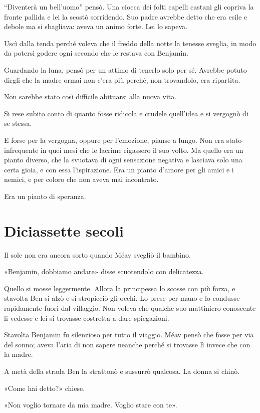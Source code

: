 \documentclass[a4paper,10pt]{memoir}
\begin{document}
``Diventerà un bell'uomo'' pensò. Una ciocca dei folti capelli castani gli copriva la fronte pallida e lei la scostò
sorridendo. Suo padre avrebbe detto che era esile e debole ma si sbagliava: aveva un animo forte. Lei lo sapeva.

Uscì dalla tenda perché voleva che il freddo della notte la tenesse sveglia, in modo da potersi godere ogni secondo che
le restava con Benjamin.

Guardando la luna, pensò per un attimo di tenerlo solo per sé. Avrebbe potuto dirgli che la madre ormai non c'era più
perché, non trovandolo, era ripartita.

Non sarebbe stato così difficile abituarsi alla nuova vita.

Si rese subito conto di quanto fosse ridicola e crudele quell'idea e si vergognò di se stessa.

E forse per la vergogna, oppure per l'emozione, pianse a lungo. Non era stato infrequente in quei mesi che le lacrime
rigassero il suo volto. Ma quello era un pianto diverso, che la svuotava di ogni sensazione negativa e lasciava solo una
certa gioia, e con essa l'ispirazione. Era un pianto d'amore per gli amici e i nemici, e per coloro che non aveva mai
incontrato.

Era un pianto di speranza.

\chapter{Diciassette secoli}

Il sole non era ancora sorto quando Méav svegliò il bambino.

«Benjamin, dobbiamo andare» disse scuotendolo con delicatezza.

Quello si mosse leggermente. Allora la principessa lo scosse con più forza, e stavolta Ben si alzò e si stropicciò gli
occhi. Lo prese per mano e lo condusse rapidamente fuori dal villaggio. Non voleva che qualche suo mattiniero conoscente
li vedesse e lei si trovasse costretta a dare spiegazioni.

Stavolta Benjamin fu silenzioso per tutto il viaggio. Méav pensò che fosse per via del sonno; aveva l'aria di non sapere
neanche perché si trovasse lì invece che con la madre.

A metà della strada Ben la strattonò e sussurrò qualcosa. La donna si chinò.

«Come hai detto?» chiese.

«Non voglio tornare da mia madre. Voglio stare con te».
\end{document}
